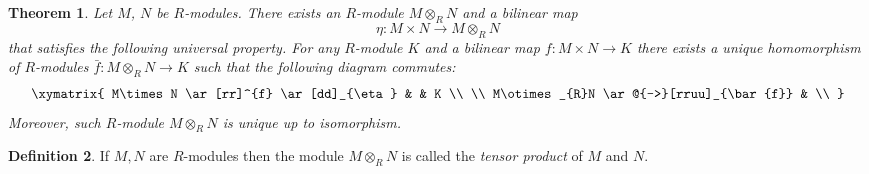 \documentclass[12pt, letterpaper, oneside]{article}
\theoremstyle{plain}
\newtheorem{theorem}{Theorem}[section]
\theoremstyle{definition}
\newtheorem{definition}[theorem]{Definition}
\newcommand{\vs}{\vskip 5mm}
\begin{document}
\vs\vs

\begin{theorem}
\label{THM_TENSORPRODEXISTENCE}
Let $M$, $N$  be $R$-modules. There exists an $R$-module $M\otimes_{R}N$
and a bilinear map 
$$\eta\colon M\times N \to M\otimes_{R} N $$
that satisfies the following universal property. For any  $R$-module $K$ and 
a bilinear map  $f\colon M\times N \to K$  
there exists a unique homomorphism of $R$-modules $\bar f\colon M\otimes_{R}N \to K$ such that the 
following diagram commutes:
$$
\xymatrix{
M\times N \ar[rr]^{f} \ar[dd]_{\eta} & & K \\
\\
M\otimes_{R}N \ar@{-->}[rruu]_{\bar{f}} & \\
}
$$
Moreover,  such  $R$-module $M\otimes_{R}N$ is unique up to isomorphism. 
\end{theorem}



\vs\vs


\begin{definition}
If $M, N$ are $R$-modules then the module $M\otimes_{R}N$ is called 
the \emph{tensor product} of $M$ and $N$.
\end{definition}



\vs\vs
\end{document}
